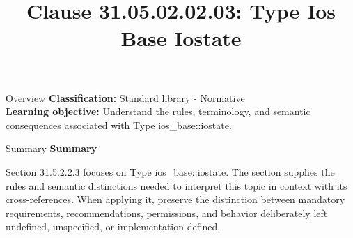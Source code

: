 \documentclass[10pt,letterpaper]{article}
\title{Clause 31.05.02.02.03: Type Ios Base Iostate}
\author{}
\date{}
\begin{document}
\maketitle
\begin{CornellOverviewBox}{Overview}
\textbf{Classification:} Standard library - Normative\\[2pt]
\textbf{Learning objective:} Understand the rules, terminology, and semantic consequences associated with Type ios\_base::iostate.
\end{CornellOverviewBox}\begin{CornellSummaryBox}{Summary}
{\sffamily\bfseries\color{Accent} Summary}\par\vspace{3pt}Section 31.5.2.2.3 focuses on Type ios\_base::iostate. The section supplies the rules and semantic distinctions needed to interpret this topic in context with its cross-references. When applying it, preserve the distinction between mandatory requirements, recommendations, permissions, and behavior deliberately left undefined, unspecified, or implementation-defined.
\end{CornellSummaryBox}
\end{document}

